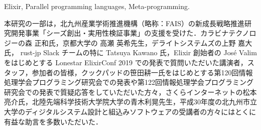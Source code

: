 \documentclass[submit,PRO]{ipsj}
\begin{document}
\begin{ekeyword}
Elixir, Parallel programming languages, Meta-programming.
\end{ekeyword}

\maketitle



\begin{acknowledgment}
本研究の一部は，北九州産業学術推進機構（略称：FAIS）の新成長戦略推進研究開発事業「シーズ創出・実用性検証事業」の支援を受けた．カラビナテクノロジーの森 正和氏，京都大学の 高瀬 英希先生，デライトシステムズの上野 嘉大氏， rust-jp Slack チームの特に Tatsuya Kawano 氏，Elixir 創始者の Jos\'{e} Valim をはじめとする Lonestar ElixirConf 2019 での発表\cite{ZACKY19-Hastega}で質問いただいた講演者，スタッフ，参加者の皆様，クックパッドの笹田耕一氏をはじめとする第120回情報処理学会プログラミング研究会での発表\cite{ZACKY18J}や第122回情報処理学会プログラミング研究会での発表\cite{Hisae19J}で質疑応答をしていただいた方々，さくらインターネットの松本亮介氏，北陸先端科学技術大学院大学の青木利晃先生，平成30年度の北九州市立大学のディジタルシステム設計と組込みソフトウェアの受講者の方々にはとくに有益な助言を多数いただいた．
\end{acknowledgment}




\end{document}
